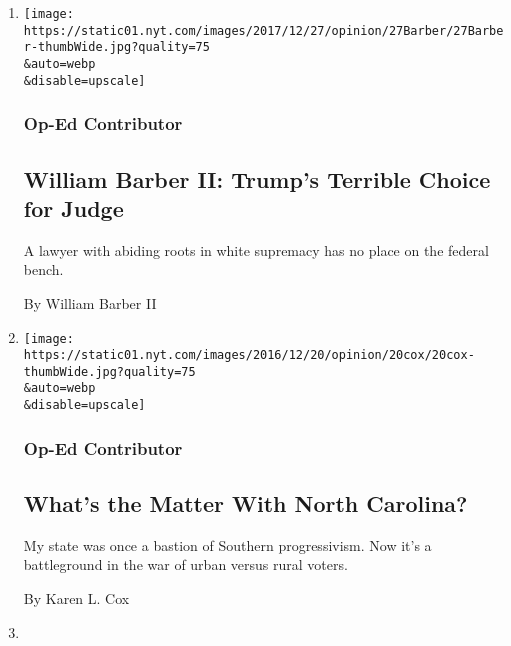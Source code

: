 \begin{enumerate}
\def\labelenumi{\arabic{enumi}.}
\item
  \href{/2017/12/26/opinion/william-barber-trumps-judge-farr.html}{}

  \texttt{[image: https://static01.nyt.com/images/2017/12/27/opinion/27Barber/27Barber-thumbWide.jpg?quality=75\\\&auto=webp\\\&disable=upscale]}

  \hypertarget{op-ed-contributor}{%
  \subsubsection{Op-Ed Contributor}\label{op-ed-contributor}}

  \hypertarget{william-barber-ii-trumps-terrible-choice-for-judge}{%
  \subsection{William Barber II: Trump's Terrible Choice for
  Judge}\label{william-barber-ii-trumps-terrible-choice-for-judge}}

  A lawyer with abiding roots in white supremacy has no place on the
  federal bench.

  By William Barber II
\item
  \href{/2016/12/19/opinion/whats-the-matter-with-north-carolina.html}{}

  \texttt{[image: https://static01.nyt.com/images/2016/12/20/opinion/20cox/20cox-thumbWide.jpg?quality=75\\\&auto=webp\\\&disable=upscale]}

  \hypertarget{op-ed-contributor-1}{%
  \subsubsection{Op-Ed Contributor}\label{op-ed-contributor-1}}

  \hypertarget{whats-the-matter-with-north-carolina}{%
  \subsection{What's the Matter With North
  Carolina?}\label{whats-the-matter-with-north-carolina}}

  My state was once a bastion of Southern progressivism. Now it's a
  battleground in the war of urban versus rural voters.

  By Karen L. Cox
\item
  \href{/2016/10/30/travel/southern-barbecue-bbq-sandwich-north-carolina.html}{}


\end{enumerate}
